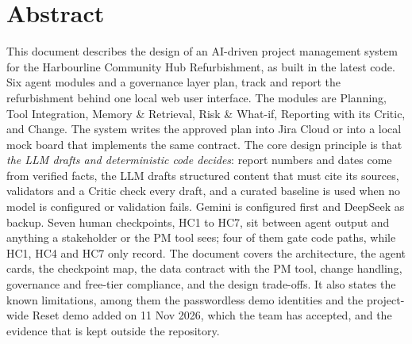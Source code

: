 \chapter*{Abstract}

This document describes the design of an AI-driven project management system for the Harbourline Community Hub Refurbishment, as built in the latest code. Six agent modules and a governance layer plan, track and report the refurbishment behind one local web user interface. The modules are Planning, Tool Integration, Memory \& Retrieval, Risk \& What-if, Reporting with its Critic, and Change. The system writes the approved plan into Jira Cloud or into a local mock board that implements the same contract. The core design principle is that \emph{the LLM drafts and deterministic code decides}: report numbers and dates come from verified facts, the LLM drafts structured content that must cite its sources, validators and a Critic check every draft, and a curated baseline is used when no model is configured or validation fails. Gemini is configured first and DeepSeek as backup. Seven human checkpoints, HC1 to HC7, sit between agent output and anything a stakeholder or the PM tool sees; four of them gate code paths, while HC1, HC4 and HC7 only record. The document covers the architecture, the agent cards, the checkpoint map, the data contract with the PM tool, change handling, governance and free-tier compliance, and the design trade-offs. It also states the known limitations, among them the passwordless demo identities and the project-wide Reset demo added on 11 Nov 2026, which the team has accepted, and the evidence that is kept outside the repository.
